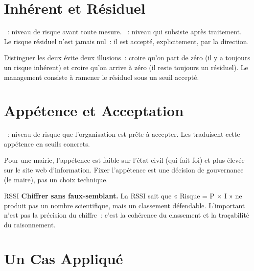 \section{Inhérent et Résiduel}
\label{sec:c11-residuel}

\begin{boxdef}
~: niveau de risque avant toute mesure.
~: niveau qui subsiste après traitement. Le risque
résiduel n'est jamais nul~: il est accepté, explicitement, par la direction.
\end{boxdef}

Distinguer les deux évite deux illusions~: croire qu'on part de zéro (il y a
toujours un risque inhérent) et croire qu'on arrive à zéro (il reste toujours
un résiduel). Le management consiste à ramener le résiduel sous un seuil
accepté.

\section{Appétence et Acceptation}
\label{sec:c11-appetence}

\begin{boxdef}
~: niveau de risque que l'organisation est prête
à accepter. Les  traduisent cette appétence en
seuils concrets.
\end{boxdef}

Pour une mairie, l'appétence est faible sur l'état civil (qui fait foi) et plus
élevée sur le site web d'information. Fixer l'appétence est une décision de
gouvernance (le maire), pas un choix technique.

\begin{boxmetier}{RSSI}
\textbf{Chiffrer sans faux-semblant.} La RSSI sait que « Risque = P × I » ne
produit pas un nombre scientifique, mais un classement défendable. L'important
n'est pas la précision du chiffre~: c'est la cohérence du classement et la
traçabilité du raisonnement.
\end{boxmetier}

\section{Un Cas Appliqué}
\label{sec:c11-cas}

